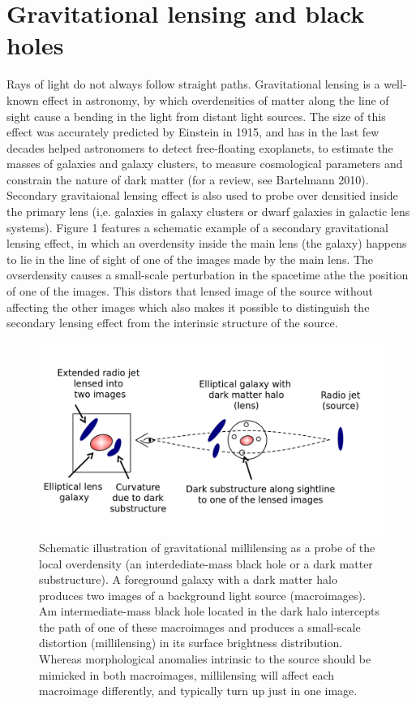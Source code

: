\documentclass[a4paper, 11pt]{article}
\begin{document}
\section{Gravitational lensing and black holes}
Rays of light do not always follow straight paths. Gravitational lensing is a well-known effect in astronomy, by which overdensities of matter along the line of sight cause a bending in the light from distant light sources. The size of this effect was accurately predicted by Einstein in 1915, and has in the last few decades helped astronomers to detect free-floating exoplanets, to estimate the masses of galaxies and galaxy clusters, to measure cosmological parameters and constrain the nature of dark matter (for a review, see Bartelmann 2010). Secondary gravitaional lensing effect is also used to probe over densitied inside the primary lens (i,e. galaxies in galaxy clusters or dwarf galaxies in galactic lens systems). Figure 1 features a schematic example of a secondary gravitational lensing effect, in which an overdensity inside the main lens (the galaxy) happens to lie in the line of sight of one of the images made by the main lens. The ovserdensity causes a small-scale perturbation in the spacetime athe the position of one of the images. This distors that lensed image of the source without affecting the other images which also makes it possible to distinguish the secondary lensing effect from the interinsic structure of the source.

\begin{figure}[tbh]
\centering
\includegraphics[scale=0.3]{Figure-lensing-v3.jpg}
\caption{Schematic illustration of gravitational millilensing as a probe of the local overdensity (an interdediate-mass black hole or a dark matter substructure). A foreground galaxy with a dark matter halo produces two images of a background light source (macroimages). Am intermediate-mass black hole located in the dark halo intercepts the path of one of these macroimages and produces a small-scale distortion (millilensing) in its surface brightness distribution. Whereas morphological anomalies intrinsic to the source should be mimicked in both macroimages, millilensing will affect each macroimage differently, and typically turn up just in one image.
}
\end{figure}
\end{document}
